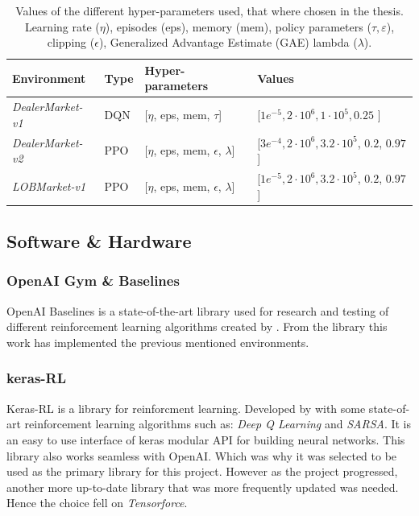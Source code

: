 \documentclass{kththesis}
\theoremstyle{definition}
\begin{document}
\begin{table}[H]
\centering
\caption{Values of the different hyper-parameters used, that where chosen in the thesis. Learning rate ($\eta$), episodes (eps), memory (mem), policy parameters ($\tau, \varepsilon$), clipping ($\epsilon$), Generalized Advantage Estimate (GAE) lambda ($\lambda$).}
\label{tab:e2}
\begin{tabular}{llll}
 \textbf{Environment} & \textbf{Type} & \textbf{Hyper-parameters} & \textbf{Values}  \\ \hline
 \textit{DealerMarket-v1} & DQN  & [$\eta$, eps, mem, $\tau$] & [$1e^{-5}, 2\cdot10^6, 1\cdot10^5, 0.25$ ]  \\
 \textit{DealerMarket-v2} & PPO  & [$\eta$, eps, mem, $\epsilon$, $\lambda$] & [$3e^{-4}, 2\cdot10^6, 3.2\cdot10^5$, $0.2$, $0.97$]  \\
 \textit{LOBMarket-v1} & PPO  & [$\eta$, eps, mem, $\epsilon$, $\lambda$] & [$1e^{-5}, 2\cdot10^6, 3.2\cdot10^5$, $0.2$, $0.97$]  \\
\end{tabular}
\end{table}

\newpage
\subsection{Software \& Hardware}

\subsubsection*{OpenAI Gym \& Baselines}
OpenAI Baselines is a state-of-the-art library used for research and testing of different reinforcement learning algorithms created by \textcite{baselines}. From the library this work has implemented the previous mentioned environments.

\subsubsection*{keras-RL}
Keras-RL is a library for reinforcment learning. Developed by \textcite{plappert2016kerasrl} with some state-of-art reinforcement learning algorithms such as: \textit{Deep Q Learning} and \textit{SARSA}. It is an easy to use interface of keras modular API for building neural networks. This library also works seamless with OpenAI. Which was why it was selected to be used as the primary library for this project. However as the project progressed, another more up-to-date library that was more frequently updated was needed. Hence the choice fell on \textit{Tensorforce}.  
\end{document}
